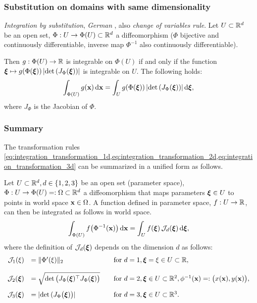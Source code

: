 \subsubsection{Substitution on domains with same dimensionality}
\emph{Integration by substitution}, \textit{German }, also \emph{change of variables rule}.
Let $U \subset \mathbb{R}^d$ be an open set, $\Phi:U \to \Phi(U) \subset\mathbb{R}^d$ a diffeomorphism ($\Phi$ bijective and continuously differentiable, inverse map $\Phi^{-1}$ also continuously differentiable).

Then $g:\Phi(U) \to \mathbb{R}$ is integrable on $\Phi(U)$ if and only if the function $\boldsymbol{\xi} \mapsto g(\Phi(\boldsymbol{\xi}))\,|\hbox{det} \,(J_{\Phi}(\boldsymbol{\xi}))|$ is integrable on $U$. The following holds:
\begin{equation}\label{eq:integration_transformation_3d}
  \begin{array}{ll}
    \ds\int_{\Phi(U)} g(\bfx)\,\d \bfx = \ds\int_U g(\Phi(\bfxi))\,|\det(J_{\Phi}(\bfxi))|\,\d \bfxi,
  \end{array}
\end{equation}
where $J_{\Phi}$ is the Jacobian of $\Phi$.

\subsubsection{Summary}
The transformation rules \cref{eq:integration_transformation_1d,eq:integration_transformation_2d,eq:integration_transformation_3d} can be summarized in a unified form as follows.

Let $U \subset \mathbb{R}^d, d\in\{1,2,3\}$ be an open set (parameter space), $\Phi:U \to \Phi(U)=:\Omega \subset\mathbb{R}^d$ a diffeomorphism that maps parameters $\boldsymbol{\xi} \in U$ to points in world space $\textbf{x} \in \Omega$. A function defined in parameter space, $f:U\to \mathbb{R}$, can then be integrated as follows in world space.
%
\begin{equation}\label{eq:integration_transformation_dd}
  \begin{array}{lll}
    \ds\int_{\Phi(U)} f\big(\Phi^{-1}(\bfx)\big)\,\d \bfx = \ds\int_U f(\bfxi)\,\mathcal{J}_d(\bfxi)\,\d \bfxi,
  \end{array}
\end{equation}
where the definition of $\mathcal{J}_d(\boldsymbol{\xi})$  depends on the dimension $d$ as follows:
%
\begin{equation*}
  \begin{array}{rll}
    \mathcal{J}_1(\xi) &= \Vert \Phi'(\xi) \Vert_2 &\quad \text{for }d=1, \boldsymbol{\xi}=\xi \in U \subset \mathbb{R},\\[4mm]
    \mathcal{J}_2(\boldsymbol{\xi}) &= \sqrt{\hbox{det} \, \big(J_{\Phi}(\boldsymbol{\xi})^\top J_{\Phi}(\boldsymbol{\xi})\big)} &\quad \text{for }d=2, \boldsymbol{\xi}\in U \subset \mathbb{R}^2, \phi^{-1}(\textbf{x}) =: \big(x(\textbf{x}), y(\textbf{x})\big),\\[4mm]
    \mathcal{J}_3(\boldsymbol{\xi}) &= |\hbox{det} \, (J_{\Phi}\big(\boldsymbol{\xi})\big)| &\quad \text{for }d=3, \boldsymbol{\xi}\in U \subset \mathbb{R}^3.
  \end{array}
\end{equation*}

\newpage
\nocite{*}
{}


%


